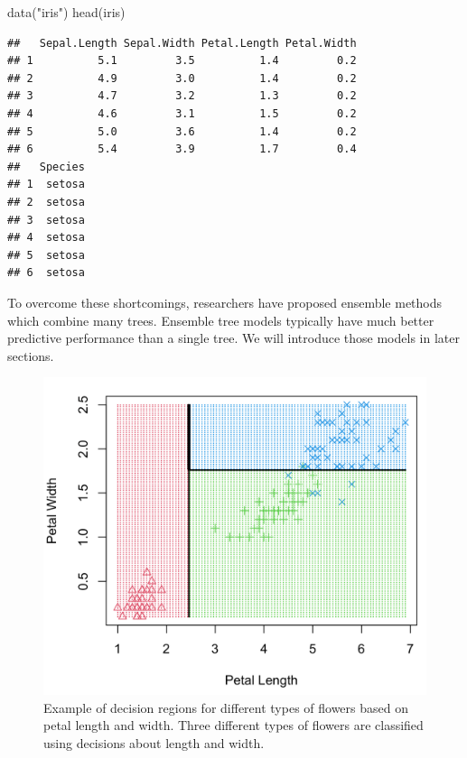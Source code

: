 \documentclass[
  12pt,
]{krantz}
\makeatletter
\newenvironment{Shaded}{\begin{snugshade}}{\end{snugshade}}
\newcommand{\FunctionTok}[1]{\textcolor[rgb]{0,0,0}{#1}}
\newcommand{\NormalTok}[1]{#1}
\newcommand{\StringTok}[1]{\textcolor[rgb]{0.5,0.5,0.5}{#1}}
\newenvironment{kframe}{%
\medskip{}
\setlength{\fboxsep}{.8em}
 \def\at@end@of@kframe{}%
 \ifinner\ifhmode%
  \def\at@end@of@kframe{\end{minipage}}%
  \begin{minipage}{\columnwidth}%
 \fi\fi%
 \def\FrameCommand##1{\hskip\@totalleftmargin \hskip-\fboxsep
 \colorbox{shadecolor}{##1}\hskip-\fboxsep
     \hskip-\linewidth \hskip-\@totalleftmargin \hskip\columnwidth}%
 \MakeFramed {\advance\hsize-\width
   \@totalleftmargin\z@ \linewidth\hsize
   \@setminipage}}%
 {\par\unskip\endMakeFramed%
 \at@end@of@kframe}
\renewenvironment{Shaded}{\begin{kframe}}{\end{kframe}}
\makeatother
\begin{document}
\begin{Shaded}
\begin{Highlighting}[]
\FunctionTok{data}\NormalTok{(}\StringTok{"iris"}\NormalTok{)}
\FunctionTok{head}\NormalTok{(iris)}
\end{Highlighting}
\end{Shaded}

\begin{verbatim}
##   Sepal.Length Sepal.Width Petal.Length Petal.Width
## 1          5.1         3.5          1.4         0.2
## 2          4.9         3.0          1.4         0.2
## 3          4.7         3.2          1.3         0.2
## 4          4.6         3.1          1.5         0.2
## 5          5.0         3.6          1.4         0.2
## 6          5.4         3.9          1.7         0.4
##   Species
## 1  setosa
## 2  setosa
## 3  setosa
## 4  setosa
## 5  setosa
## 6  setosa
\end{verbatim}

To overcome these shortcomings, researchers have proposed ensemble methods which combine many trees. Ensemble tree models typically have much better predictive performance than a single tree. We will introduce those models in later sections.

\begin{figure}

{\centering \includegraphics[width=0.8\linewidth]{images/decisionregion} 

}

\caption{Example of decision regions for different types of flowers based on petal length and width. Three different types of flowers are classified using decisions about length and width.}\label{fig:decisionregion}
\end{figure}
\end{document}
